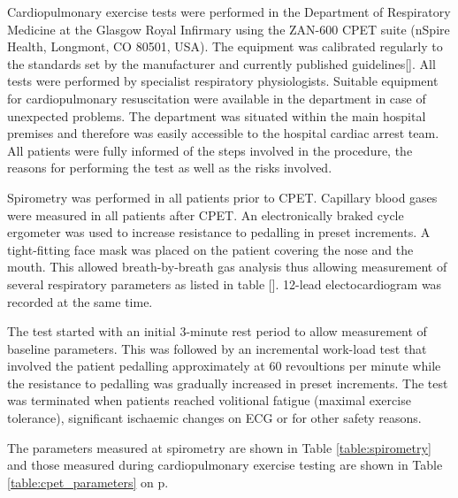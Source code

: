 Cardiopulmonary exercise tests were performed in the Department of Respiratory Medicine at the Glasgow Royal Infirmary using the ZAN-600 CPET suite (nSpire Health, Longmont, CO 80501, USA). The equipment was calibrated regularly to the standards set by the manufacturer and currently published guidelines[]. All tests were performed by specialist respiratory physiologists. Suitable equipment for cardiopulmonary resuscitation were available in the department in case of unexpected problems. The department was situated within the main hospital premises and therefore was easily accessible to the hospital cardiac arrest team. All patients were fully informed of the steps involved in the procedure, the reasons for performing the test as well as the risks involved. 

Spirometry was performed in all patients prior to CPET. Capillary blood gases were measured in all patients after CPET. An electronically braked cycle ergometer was used to increase resistance to pedalling in preset increments. A tight-fitting face mask was placed on the patient covering the nose and the mouth. This allowed breath-by-breath gas analysis thus allowing measurement of several respiratory parameters as listed in table []. 12-lead electocardiogram was recorded at the same time. 

The test started with an initial 3-minute rest period to allow measurement of baseline parameters. This was followed by an incremental work-load test that involved the patient pedalling approximately at 60 revoultions per minute while the resistance to pedalling was gradually increased in preset increments. The test was terminated when patients reached volitional fatigue (maximal exercise tolerance), significant ischaemic changes on ECG or for other safety reasons. 

The parameters measured at spirometry are shown in Table \ref{table:spirometry} and those measured during cardiopulmonary exercise testing are shown in Table \ref{table:cpet_parameters} on p\pageref{table:cpet_parameters}.

